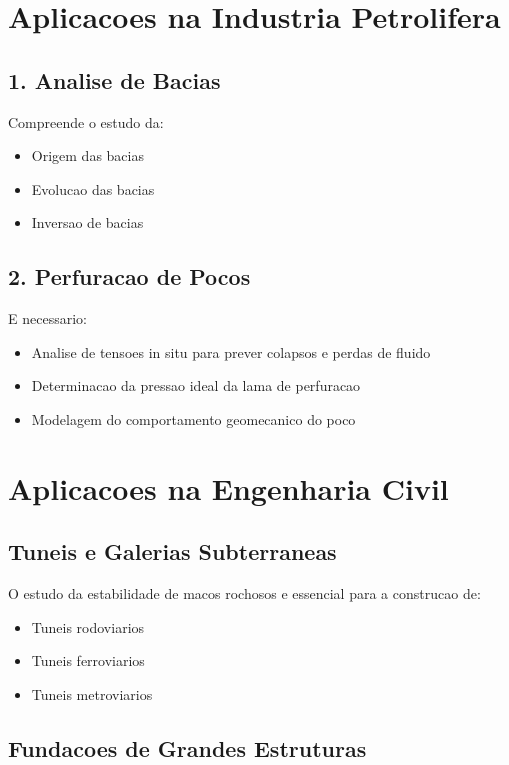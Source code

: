 \documentclass[12pt,a4paper,twoside]{book}
\begin{document}
\section{Aplicacoes na Industria Petrolifera}

\subsection{1. Analise de Bacias}

Compreende o estudo da:
\begin{itemize}
    \item Origem das bacias
    \item Evolucao das bacias
    \item Inversao de bacias
\end{itemize}

\subsection{2. Perfuracao de Pocos}

E necessario:
\begin{itemize}
    \item Analise de tensoes in situ para prever colapsos e perdas de fluido
    \item Determinacao da pressao ideal da lama de perfuracao
    \item Modelagem do comportamento geomecanico do poco
\end{itemize}

\section{Aplicacoes na Engenharia Civil}

\subsection{Tuneis e Galerias Subterraneas}

O estudo da estabilidade de macos rochosos e essencial para a construcao de:
\begin{itemize}
    \item Tuneis rodoviarios
    \item Tuneis ferroviarios
    \item Tuneis metroviarios
\end{itemize}

\subsection{Fundacoes de Grandes Estruturas}
\end{document}
